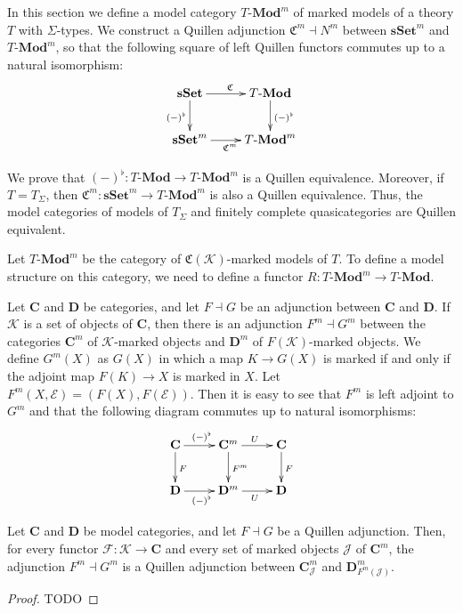 \documentclass[reqno]{amsart}
\theoremstyle{definition}
\theoremstyle{remark}
\newcommand{\cat}[1]{\mathbf{#1}}
\newcommand{\C}{\cat{C}}
\newcommand{\D}{\cat{D}}
\newcommand{\Mod}[1]{#1\text{-}\cat{Mod}}
\newcommand{\sSet}{\cat{sSet}}
\newcommand{\K}{$\mathcal{K}$}
\numberwithin{figure}{section}
\begin{document}
In this section we define a model category $\Mod{T}^m$ of marked models of a theory $T$ with $\Sigma$-types.
We construct a Quillen adjunction $\mathfrak{C}^m \dashv N^m$ between $\sSet^m$ and $\Mod{T}^m$,
so that the following square of left Quillen functors commutes up to a natural isomorphism:
\[ \xymatrix{ \sSet \ar[d]_{(-)^\flat} \ar[r]^{\mathfrak{C}} & \Mod{T} \ar[d]^{(-)^\flat} \\
              \sSet^m \ar[r]_{\mathfrak{C}^m}                & \Mod{T}^m
            } \]

We prove that $(-)^\flat : \Mod{T} \to \Mod{T}^m$ is a Quillen equivalence.
Moreover, if $T = T_\Sigma$, then $\mathfrak{C}^m : \sSet^m \to \Mod{T}^m$ is also a Quillen equivalence.
Thus, the model categories of models of $T_\Sigma$ and finitely complete quasicategories are Quillen equivalent.

Let $\Mod{T}^m$ be the category of $\mathfrak{C}(\mathcal{K})$-marked models of $T$.
To define a model structure on this category, we need to define a functor $R : \Mod{T}^m \to \Mod{T}$.

Let $\C$ and $\D$ be categories, and let $F \dashv G$ be an adjunction between $\C$ and $\D$.
If $\mathcal{K}$ is a set of objects of $\C$, then there is an adjunction $F^m \dashv G^m$ between
the categories $\C^m$ of \K-marked objects and $\D^m$ of $F(\mathcal{K})$-marked objects.
We define $G^m(X)$ as $G(X)$ in which a map $K \to G(X)$ is marked if and only if the adjoint map $F(K) \to X$ is marked in $X$.
Let $F^m(X,\mathcal{E}) = (F(X),F(\mathcal{E}))$.
Then it is easy to see that $F^m$ is left adjoint to $G^m$ and that the following diagram commutes up to natural isomorphisms:
\[ \xymatrix{ \C \ar[r]^{(-)^\flat} \ar[d]^F & \C^m \ar[d]^{F^m} \ar[r]^U & \C \ar[d]^F \\
              \D \ar[r]_{(-)^\flat}          & \D^m \ar[r]_U              & \D
            } \]

\begin{lem}
Let $\C$ and $\D$ be model categories, and let $F \dashv G$ be a Quillen adjunction.
Then, for every functor $\mathcal{F} : \mathcal{K} \to \C$ and every set of marked objects $\mathcal{J}$ of $\C^m$,
the adjunction $F^m \dashv G^m$ is a Quillen adjunction between $\C^m_\mathcal{J}$ and $\D^m_{F^m(\mathcal{J})}$.
\end{lem}
\begin{proof}
TODO
\end{proof}
\end{document}
